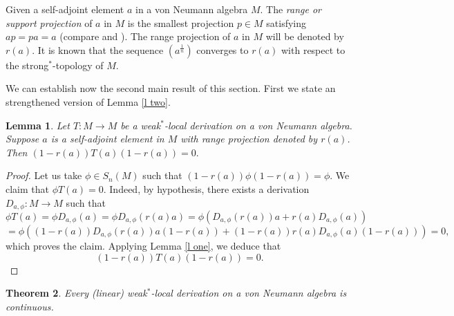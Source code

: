 \documentclass[11pt]{amsart}
\newtheorem{theorem}{Theorem}[section]
\newtheorem{lemma}[theorem]{Lemma}
\begin{document}
Given a self-adjoint element $a$ in a von Neumann algebra $M.$ The \emph{range or support projection} of $a$ in $M$ is the smallest projection $p\in M$ satisfying $a p = p a = a$ (compare \cite[Definition 1.10.3]{Sak} and \cite[2.2.7]{Ped}). The range projection of $a$ in $M$ will be denoted by $r(a).$ It is known that the sequence $(a^{\frac1n})$ converges to $r(a)$ with respect to the strong$^*$-topology of $M$.\smallskip

We can establish now the second main result of this section. First we state an strengthened version of Lemma \ref{l two}.

\begin{lemma}\label{l two bis} Let $T: M\to M$ be a weak$^*$-local derivation on a von Neumann algebra. Suppose $a$ is a self-adjoint element in $M$ with range projection denoted by $r(a)$. Then $ (1-r(a)) T(a) (1-r(a)) = 0.$
\end{lemma}

\begin{proof}
Let us take $\phi\in S_n(M)$ such that $(1-r(a))\phi (1-r(a)) =\phi$. We claim that $\phi T(a) =0.$ Indeed, by hypothesis, there exists a derivation $D_{a,\phi} :M\to M$ such that $$\phi T(a) = \phi D_{a,\phi} (a)= \phi D_{a,\phi} (r(a) a) = \phi (D_{a,\phi} (r(a)) a + r(a) D_{a,\phi} (a))$$ $$ =\phi ((1-r(a)) D_{a,\phi} (r(a)) a (1-r(a)) + (1-r(a)) r(a) D_{a,\phi} (a)(1-r(a))) =0 ,$$ which proves the claim. Applying Lemma \ref{l one}, we deduce that $$(1-r(a)) T(a) (1-r(a)) = 0.$$
\end{proof}

\begin{theorem}\label{t automatic continuity weak*local derivation} Every (linear) weak$^*$-local derivation on a von Neumann algebra is continuous.
\end{theorem}
\end{document}
